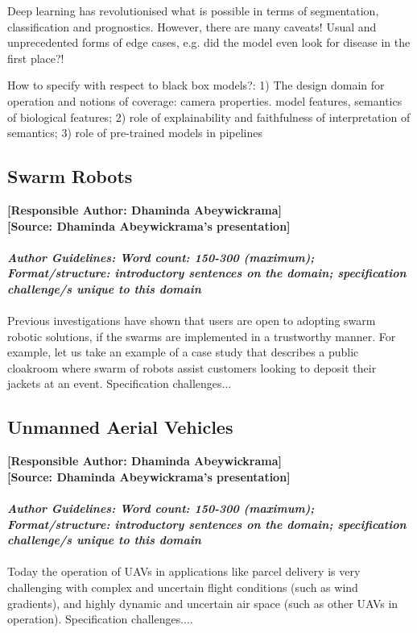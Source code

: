 \documentclass[sigconf]{acmart}
\begin{document}
Deep learning has revolutionised what is possible in terms of segmentation, classification and prognostics. However, there are many caveats!
Usual and unprecedented forms of edge cases, e.g. did the model even look for disease in the first place?!

How to specify with respect to black box models?:
1) The design domain for operation and notions of coverage: camera properties. model features, semantics of biological features; 2) role of explainability and faithfulness of interpretation of semantics; 3) role of pre-trained models in pipelines

\subsection{Swarm Robots}
\textbf{[Responsible Author:  Dhaminda Abeywickrama]}\\
\textbf{[Source: Dhaminda Abeywickrama's presentation]} \\\\
\noindent\textbf{\textit{Author Guidelines: Word count: 150-300 (maximum); \\Format/structure: introductory sentences on the domain; specification challenge/s unique to this domain}}\\\\
Previous investigations have shown that users are open to adopting swarm robotic solutions, if the swarms are implemented in a trustworthy manner. 
For example, let us take an example of a case study that describes a public cloakroom where swarm of robots assist customers looking to deposit their jackets at an event. Specification challenges...

\subsection{Unmanned Aerial Vehicles}
\textbf{[Responsible Author:  Dhaminda Abeywickrama]}\\
\textbf{[Source: Dhaminda Abeywickrama's presentation]} 
\\\\
\noindent\textbf{\textit{Author Guidelines: Word count: 150-300 (maximum); \\Format/structure: introductory sentences on the domain; specification challenge/s unique to this domain}}\\\\
Today the operation of UAVs in applications like parcel delivery is very challenging with complex and uncertain flight conditions (such as wind gradients), and highly dynamic and uncertain air space (such as other UAVs in operation). Specification challenges....
\end{document}

